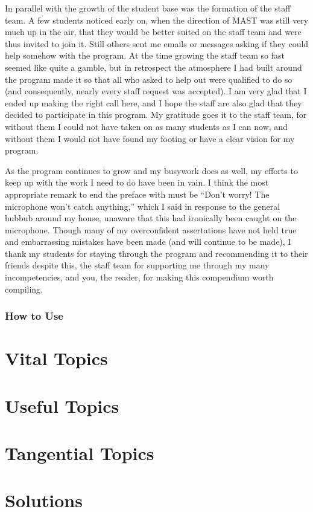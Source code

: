 \documentclass[blue,onecol]{shooting}
\begin{document}
In parallel with the growth of the student base was the formation of the staff team. A few students noticed early on, when the direction of MAST was still very much up in the air, that they would be better suited on the staff team and were thus invited to join it. Still others sent me emails or messages asking if they could help somehow with the program. At the time growing the staff team so fast seemed like quite a gamble, but in retrospect the atmosphere I had built around the program made it so that all who asked to help out were qualified to do so (and consequently, nearly every staff request was accepted). I am very glad that I ended up making the right call here, and I hope the staff are also glad that they decided to participate in this program. My gratitude goes it to the staff team, for without them I could not have taken on as many students as I can now, and without them I would not have found my footing or have a clear vision for my program.

As the program continues to grow and my busywork does as well, my efforts to keep up with the work I need to do have been in vain. I think the most appropriate remark to end the preface with must be ``Don't worry! The microphone won't catch anything,'' which I said in response to the general hubbub around my house, unaware that this had ironically been caught on the microphone. Though many of my overconfident assertations have not held true and embarrassing mistakes have been made (and will continue to be made), I thank my students for staying through the program and recommending it to their friends despite this, the staff team for supporting me through my many incompetencies, and you, the reader, for making this compendium worth compiling.

\pagebreak

\section*{How to Use}

\pagebreak

\toc

\part{Vital Topics}

\part{Useful Topics}

\part{Tangential Topics}

\part{Solutions}

\setcounter{chapter}{0}
\end{document}
